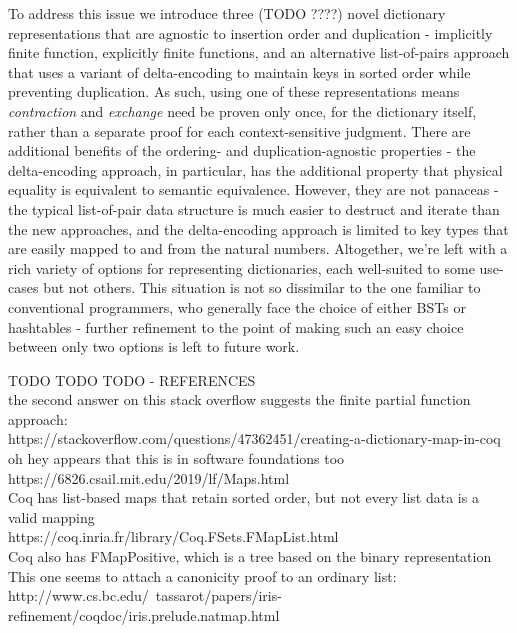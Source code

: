 \documentclass[nonacm]{acmart}
\theoremstyle{slplain}
\numberwithin{thm}{section}
\begin{document}
To address this issue we introduce three (TODO ????) novel dictionary representations that are agnostic
to insertion order and duplication - implicitly finite function, explicitly finite functions, and an
alternative list-of-pairs approach that uses a variant of delta-encoding to maintain keys in sorted order
while preventing duplication. As such, using one of these representations means \emph{contraction} and
\emph{exchange} need be proven only once, for the dictionary itself, rather than a separate proof for each
context-sensitive judgment. There are additional benefits of the ordering- and duplication-agnostic properties
- the delta-encoding approach, in particular, has the additional property that physical equality is
equivalent to semantic equivalence. However, they are not panaceas - the typical list-of-pair data structure
is much easier to destruct and iterate than the new approaches, and the delta-encoding approach is limited
to key types that are easily mapped to and from the natural numbers. Altogether, we're left with a rich
variety of options for representing dictionaries, each well-suited to some use-cases but not others. This
situation is not so dissimilar to the one familiar to conventional programmers, who generally face the choice
of either BSTs or hashtables - further refinement to the point of making such an easy choice between only two
options is left to future work.

TODO TODO TODO - REFERENCES
\\
the second answer on this stack overflow suggests the finite partial function approach:
\\
https://stackoverflow.com/questions/47362451/creating-a-dictionary-map-in-coq
\\
oh hey appears that this is in software foundations too
\\
https://6826.csail.mit.edu/2019/lf/Maps.html
\\
Coq has list-based maps that retain sorted order, but not every list data is a valid mapping
\\
https://coq.inria.fr/library/Coq.FSets.FMapList.html
\\
Coq also has FMapPositive, which is a tree based on the binary representation
\\
This one seems to attach a canonicity proof to an ordinary list:
\\
http://www.cs.bc.edu/~tassarot/papers/iris-refinement/coqdoc/iris.prelude.natmap.html

\clearpage
%


% 
\end{document}
